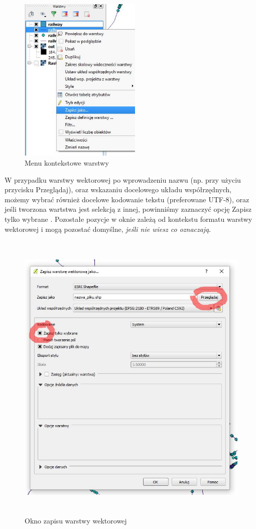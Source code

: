 \documentclass[12pt,a4paper]{book}
\begin{document}
\begin{figure}[ht]
	\centering
	\includegraphics[height=8cm]{002-menu-kontekstowe.jpg}
	\caption{Menu kontekstowe warstwy}
\end{figure}
W przypadku warstwy wektorowej po wprowadzeniu nazwu (np. przy użyciu przycisku Przeglądaj), oraz wskazaniu
docelowego układu współrzędnych, możemy wybrać również docelowe kodowanie tekstu (preferowane UTF-8), oraz jeśli tworzona wartstwa jest selekcją z innej, powinniśmy zaznaczyć opcję  Zapisz tylko wybrane . Pozostałe pozycje w oknie zależą od kontekstu formatu warstwy wektorowej i mogą pozostać domyślne, \textit{jeśli nie wiesz co oznaczają}.

\begin{figure}[ht]
	\centering
	\includegraphics[width=13cm,height=14.372cm]{002-zapisz-wektor.jpg}
	\caption{Okno zapisu warstwy wektorowej}
\end{figure}
\end{document}
